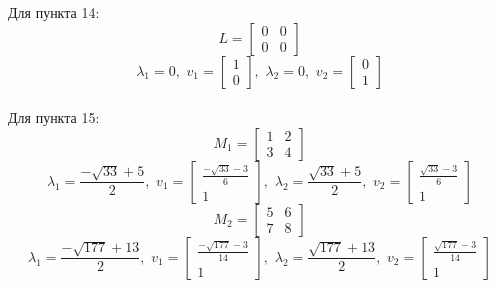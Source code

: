 \documentclass[a5paper, 10pt]{article}
\theoremstyle{definition}
\theoremstyle{plain}
\theoremstyle{remark}
\begin{document}
Для пункта 14:
\begin{equation}
L =
\begin{bmatrix}
0 & 0\\
0 & 0
\end{bmatrix}
\end{equation}
\begin{equation}
\lambda_1 = 0, \, \,
v_1 =
\begin{bmatrix}
1\\
0
\end{bmatrix}
, \, \,
\lambda_2 =  0, \, \,
v_2 =
\begin{bmatrix}
0\\
1
\end{bmatrix}
\end{equation}
\\

Для пункта 15:
\begin{equation}
M_1 =
\begin{bmatrix}
1 & 2\\
3 & 4
\end{bmatrix}
\end{equation}
\begin{equation}
\lambda_1 = \frac{-\sqrt{33} + 5}{2}, \, \,
v_1 =
\begin{bmatrix}
\frac{-\sqrt{33} - 3}{6}\\
1
\end{bmatrix}
, \, \,
\lambda_2 =  \frac{\sqrt{33} + 5}{2}, \, \,
v_2 =
\begin{bmatrix}
\frac{\sqrt{33} - 3}{6}\\
1
\end{bmatrix}
\end{equation}
\begin{equation}
M_2 =
\begin{bmatrix}
5 & 6\\
7 & 8
\end{bmatrix}
\end{equation}
\begin{equation}
\lambda_1 = \frac{-\sqrt{177} + 13}{2}, \, \,
v_1 =
\begin{bmatrix}
\frac{-\sqrt{177} - 3}{14}\\
1
\end{bmatrix}
, \, \,
\lambda_2 =  \frac{\sqrt{177} + 13}{2}, \, \,
v_2 =
\begin{bmatrix}
\frac{\sqrt{177} - 3}{14}\\
1
\end{bmatrix}
\end{equation}
\\
\end{document}
